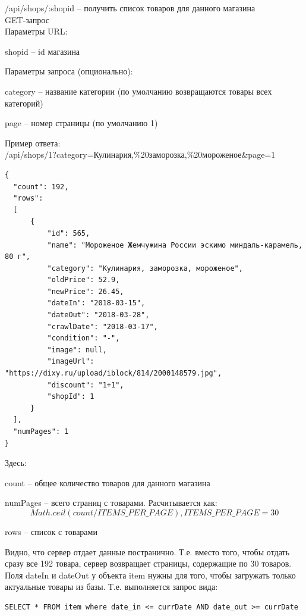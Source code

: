 \noindent
/api/shops/:shopid -- получить список товаров для данного магазина\\
GET-запрос\\
Параметры URL:
\begin{my_enumerate}
  \item shopid -- id магазина
\end{my_enumerate}
Параметры запроса (опционально):
\begin{my_enumerate}
\item category -- название категории (по умолчанию возвращаются товары всех
  категорий)
  \item page -- номер страницы (по умолчанию 1)
\end{my_enumerate}
Пример ответа:\\
/api/shops/1?category=Кулинария,\%20заморозка,\%20мороженое\&page=1
\begin{verbatim}
{
  "count": 192,
  "rows":
  [
      {
          "id": 565,
          "name": "Мороженое Жемчужина России эскимо миндаль-карамель, 80 г",
          "category": "Кулинария, заморозка, мороженое",
          "oldPrice": 52.9,
          "newPrice": 26.45,
          "dateIn": "2018-03-15",
          "dateOut": "2018-03-28",
          "crawlDate": "2018-03-17",
          "condition": "-",
          "image": null,
          "imageUrl": "https://dixy.ru/upload/iblock/814/2000148579.jpg",
          "discount": "1+1",
          "shopId": 1
      }
  ],
  "numPages": 1
}
\end{verbatim}
Здесь:\\
\begin{my_enumerate}
  \item count -- общее количество товаров для данного магазина\\
  \item numPages -- всего страниц с товарами. Расчитывается как:
    $$
    Math.ceil(count / ITEMS\_PER\_PAGE), ITEMS\_PER\_PAGE=30
    $$
  \item rows -- список с товарами\\
\end{my_enumerate}
Видно, что сервер отдает данные постранично. Т.е. вместо того, чтобы
отдать сразу все 192 товара, сервер возвращает страницы, содержащие по 30 товаров.
Поля dateIn и dateOut у объекта item нужны для того, чтобы загружать только
актуальные товары из базы. Т.е. выполняется запрос вида:
\begin{verbatim}
SELECT * FROM item where date_in <= currDate AND date_out >= currDate
\end{verbatim}

